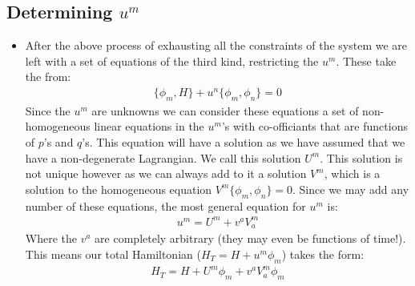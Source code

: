 \documentclass[11pt]{article}
\numberwithin{equation}{section}
\begin{document}
   \subsection{Determining $u^m$} %
   \label{sub:determining_}
   \begin{itemize}
     \item After the above process of exhausting all the constraints of the system we are left with a set of equations of the third kind, restricting the $u^m$. These take the from:
     \begin{align*}
       \{\phi_m,H\} +u^n\{\phi_m,\phi_n\} = 0 
     \end{align*}
      Since the $u^m$ are unknowns we can consider these equations a set of non-homogeneous linear equations in the $u^m$'s with co-officiants that are functions of $p$'s and $q$'s. This equation will have a solution as we have assumed that we have a non-degenerate Lagrangian. We call this solution $U^m$. This solution is not unique however as we can always add to it a solution $V^m$, which is a solution to the homogeneous equation $V^m\{\phi_m,\phi_n\}=0$. Since we may add any number of these equations, the most general equation for $u^m$ is:
      \begin{align*}
        u^m = U^m + v^aV^m_a
      \end{align*}
      Where the $v^a$ are completely arbitrary (they may even be functions of time!). This means our total Hamiltonian ($H_T = H+u^{m}\phi_m$) takes the form:
      \begin{align}
      \label{H_tot}
         H_T = H + U^m\phi_m+v^aV_a^m\phi_m
       \end{align} 
   \end{itemize}
\end{document}

